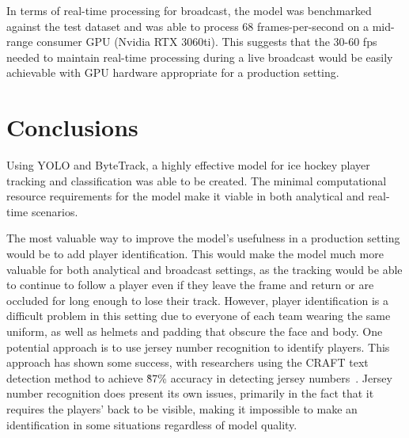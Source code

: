 \documentclass[12pt,stu,donotrepeattitle,floatsintext]{apa7}
\newcommand{\customsection}[2]{
  \phantomsection
  \section*{#1}\label{#2}
  \addcontentsline{toc}{section}{#1}
}
\begin{document}
    In terms of real-time processing for broadcast, the model was benchmarked against the test dataset and was able to process 68 frames-per-second on a mid-range consumer GPU (Nvidia RTX 3060ti).
    This suggests that the 30-60 fps needed to maintain real-time processing during a live broadcast would be easily achievable with GPU hardware appropriate for a production setting.


    \customsection{Conclusions}{conclusions}

    Using YOLO and ByteTrack, a highly effective model for ice hockey player tracking and classification was able to be created.
    The minimal computational resource requirements for the model make it viable in both analytical and real-time scenarios.

    The most valuable way to improve the model's usefulness in a production setting would be to add player identification.
    This would make the model much more valuable for both analytical and broadcast settings, as the tracking would be able to continue to follow a player even if they leave the frame and return or are occluded for long enough to lose their track.
    However, player identification is a difficult problem in this setting due to everyone of each team wearing the same uniform, as well as helmets and padding that obscure the face and body.
    One potential approach is to use jersey number recognition to identify players.
    This approach has shown some success, with researchers using the CRAFT text detection method to achieve \~87\% accuracy in detecting jersey numbers~\parencite{player-tracking}.
    Jersey number recognition does present its own issues, primarily in the fact that it requires the players' back to be visible, making it impossible to make an identification in some situations regardless of model quality.

    \printbibliography
    \clearpage
\end{document}

